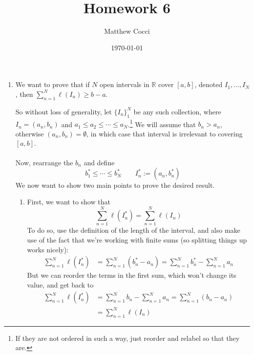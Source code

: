 \documentclass[12pt]{article}
\author{Matthew Cocci}
\title{\textbf{Homework 6}}
\date{\today}
\theoremstyle{plain}
\theoremstyle{definition}
\theoremstyle{remark}
\begin{document}
\maketitle 

\begin{enumerate} 

\item We want to prove that if $N$ open intervals in $\mathbb{R}$ cover $[a,b]$, denoted $I_1, \ldots,I_N$, then $\sum^N_{n=1} \ell(I_n)\geq b-a$. 

So without loss of generality, let $\{I_n\}_1^N$ be any such collection, where $I_n=(a_n, b_n)$ and $a_1\leq a_2\leq\cdots\leq a_N$.\footnote{If they are not ordered in such a way, just reorder and relabel so that they are.} We will assume that $b_n>a_n$, otherwise $(a_n,b_n)=\emptyset$, in which case that interval is irrelevant to covering $[a,b]$. 
\\
\\
Now, rearrange the $b_n$ and define 
\[
    b_1^* \leq \cdots \leq b_N^* \qquad
    I_n^* := (a_n, b^*_n)
\]
We now want to show two main points to prove the desired result.
\begin{enumerate}

\item First, we want to show that
\begin{equation}
    \label{q1.eq}
    \sum^N_{n=1} \ell(I_n^*) = \sum^N_{n=1} \ell(I_n) 
\end{equation}
To do so, use the definition of the length of the interval, and also make use of the fact that we're working with finite sums (so splitting things up works nicely):
\begin{align*}
    \sum^N_{n=1} \ell(I_n^*) &= \sum^N_{n=1} (b_n^* - a_n )
    = \sum^N_{n=1} b_n^* -  \sum^N_{n=1}a_n 
\end{align*}
But we can reorder the terms in the first sum, which won't change its value, and get back to 
\begin{align*}
    \sum^N_{n=1} \ell(I_n^*) &= 
        \sum^N_{n=1} b_n -  \sum^N_{n=1}a_n 
    = \sum^N_{n=1} (b_n -  a_n) \\
    &= \sum^N_{n=1} \ell(I_n) 
\end{align*}


\end{enumerate}
\end{enumerate}
\end{document}
